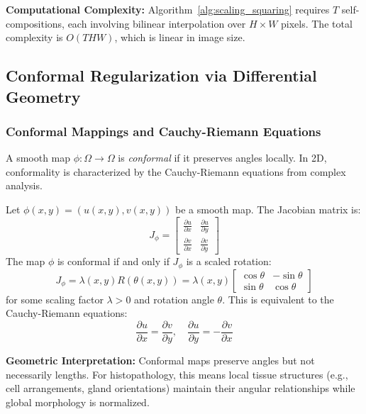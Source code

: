 \textbf{Computational Complexity:} Algorithm~\ref{alg:scaling_squaring} requires $T$ self-compositions, each involving bilinear interpolation over $H \times W$ pixels. The total complexity is $O(THW)$, which is linear in image size.

\subsection{Conformal Regularization via Differential Geometry}
\label{subsec:conformal}

\subsubsection{Conformal Mappings and Cauchy-Riemann Equations}

A smooth map $\phi: \Omega \rightarrow \Omega$ is \textit{conformal} if it preserves angles locally. In 2D, conformality is characterized by the Cauchy-Riemann equations from complex analysis.

\begin{definition}
\label{def:conformal}
Let $\phi(x,y) = (u(x,y), v(x,y))$ be a smooth map. The Jacobian matrix is:
\begin{equation}
J_\phi = \begin{bmatrix} \frac{\partial u}{\partial x} & \frac{\partial u}{\partial y} \\ \frac{\partial v}{\partial x} & \frac{\partial v}{\partial y} \end{bmatrix}
\end{equation}
The map $\phi$ is conformal if and only if $J_\phi$ is a scaled rotation:
\begin{equation}
J_\phi = \lambda(x,y) R(\theta(x,y)) = \lambda(x,y) \begin{bmatrix} \cos\theta & -\sin\theta \\ \sin\theta & \cos\theta \end{bmatrix}
\label{eq:conformal_jacobian}
\end{equation}
for some scaling factor $\lambda > 0$ and rotation angle $\theta$. This is equivalent to the Cauchy-Riemann equations:
\begin{equation}
\frac{\partial u}{\partial x} = \frac{\partial v}{\partial y}, \quad \frac{\partial u}{\partial y} = -\frac{\partial v}{\partial x}
\label{eq:cauchy_riemann}
\end{equation}
\end{definition}

\textbf{Geometric Interpretation:} Conformal maps preserve angles but not necessarily lengths. For histopathology, this means local tissue structures (e.g., cell arrangements, gland orientations) maintain their angular relationships while global morphology is normalized.

